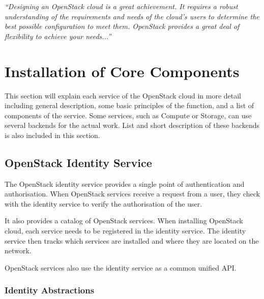 \textit{“Designing an OpenStack cloud is a great achievement. It requires a robust understanding of the requirements and needs of the cloud’s users to determine the best possible configuration to meet them. OpenStack provides a great deal of flexibility to achieve your needs...”} \cite{OperationsGuide}




\section{Installation of Core Components}

This section will explain each service of the OpenStack cloud in more detail including general description, some basic principles of the function, and a list of components of the service. Some services, such as Compute or Storage, can use several backends for the actual work. List and short description of these backends is also included in this section.


\subsection{OpenStack Identity Service}
The OpenStack identity service provides a single point of authentication and authorisation. When OpenStack services receive a request from a user, they check with the identity service to verify the authorisation of the user.

It also provides a catalog of OpenStack services. When installing OpenStack cloud, each service needs to be registered in the identity service. The identity service then tracks which services are installed and where they are located on the network.

OpenStack services also use the identity service as a common unified API.

\subsubsection*{Identity Abstractions}

